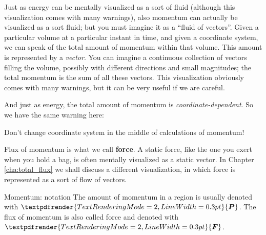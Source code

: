 \documentclass[a4paper,12pt,%
onecolumn,oneside,titlepage,%
british%
]{memoir}
\renewcommand*{\bm}[1]{\textpdfrender{TextRenderingMode=2,LineWidth=0.3pt}{\boldsymbol{#1}}}
\newcommand{\mynotew}[1]{{\footnotesize\color{midgrey}\faIcon{tools}\ #1}}
\renewcommand*{\|}[1][]{\nonscript\:#1\vert\nonscript\:\mathopen{}}
\newcommand*{\sect}{\S}%
\newcommand*{\chap}{Chapter}%
\newcommand*{\yP}{\bm{P}}
\newcommand*{\yF}{\bm{F}}
\begin{document}
Just as energy can be mentally visualized as a sort of fluid (although this visualization comes with many warnings), also momentum can actually be visualized as a sort fluid; but you must imagine it as a \enquote{fluid of vectors}.
Given a particular volume at a particular instant in time, and given a coordinate system, we can speak of the total amount of momentum within that volume. This amount is represented by a \emph{vector}. You can imagine a continuous collection of vectors filling the volume, possibly with different directions and small magnitudes; the total momentum is the sum of all these vectors. This visualization obviously comes with many warnings, but it can be very useful if we are careful.

And just as energy, the total amount of momentum is \emph{coordinate-dependent}. So we have the same warning here:
\begin{warning}
  Don't change coordinate system in the middle of calculations of momentum!
\end{warning}


Flux of momentum is what we call \textbf{force}. A static force, like the one you exert when you hold a bag, is often mentally visualized as a static vector. In \chap\,\ref{cha:total_flux} we shall discuss a different visualization, in which force is represented as a sort of flow of vectors.



\begin{definition}{Momentum: notation}
  The amount of momentum in a region is usually denoted with $\yP$. The flux of momentum is also called force and denoted with $\yF$.
\end{definition}
\end{document}
